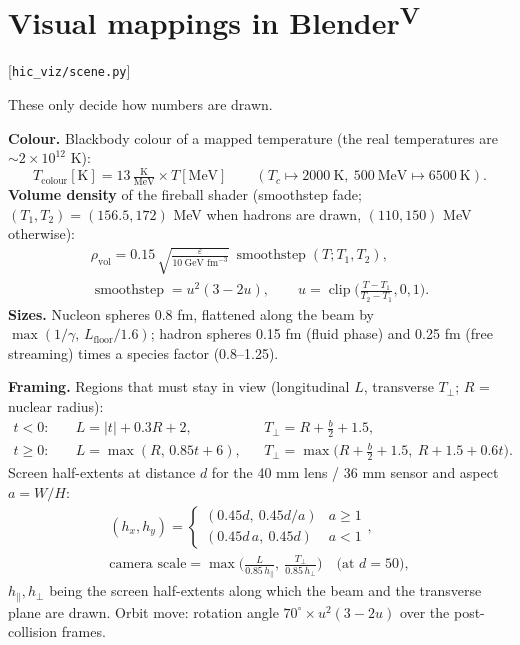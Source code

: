 \documentclass[11pt,a4paper]{article}
\newcommand{\file}[1]{\texttt{\small #1}}
\newcommand{\src}[1]{\hfill{\small\color{gray}[#1]}}
\newcommand{\vis}{\textsuperscript{\color{blue!70!black}\textbf{V}}}
\begin{document}
\section{Visual mappings in Blender\vis}
\src{\file{hic\_viz/scene.py}}

These only decide how numbers are drawn.

\textbf{Colour.} Blackbody colour of a mapped temperature (the real temperatures are $\sim2\times10^{12}$ K):
\begin{equation}
T_\text{colour}[\text{K}] = 13\,\tfrac{\text{K}}{\text{MeV}}\times T[\text{MeV}]
\qquad(T_c\mapsto2000~\text{K},\ 500~\text{MeV}\mapsto6500~\text{K}).
\end{equation}
\textbf{Volume density} of the fireball shader (smoothstep fade; $(T_1,T_2) = (156.5,172)$ MeV when hadrons are drawn,
$(110,150)$ MeV otherwise):
\begin{gather}
\rho_\text{vol} = 0.15\,\sqrt{\frac{\varepsilon}{10~\text{GeV fm}^{-3}}}\ \operatorname{smoothstep}(T;T_1,T_2),\nonumber\\
\operatorname{smoothstep} = u^2(3-2u),\qquad u=\operatorname{clip}\Big(\frac{T-T_1}{T_2-T_1},0,1\Big).
\end{gather}
\textbf{Sizes.} Nucleon spheres 0.8 fm, flattened along the beam by $\max(1/\gamma,\,L_\text{floor}/1.6)$; hadron spheres
0.15 fm (fluid phase) and 0.25 fm (free streaming) times a species factor (0.8--1.25).

\textbf{Framing.} Regions that must stay in view (longitudinal $L$, transverse $T_\perp$; $R$ = nuclear radius):
\begin{align}
t<0:&\quad L = |t|+0.3R+2, && T_\perp = R+\tfrac b2+1.5,\nonumber\\
t\ge0:&\quad L = \max(R,\,0.85t+6), && T_\perp = \max\!\big(R+\tfrac b2+1.5,\ R+1.5+0.6t\big).
\end{align}
Screen half-extents at distance $d$ for the 40 mm lens / 36 mm sensor and aspect $a=W/H$:
\begin{gather}
(h_x,h_y) = \begin{cases}(0.45d,\ 0.45d/a) & a\ge1\\ (0.45d\,a,\ 0.45d) & a<1\end{cases},\nonumber\\
\text{camera scale} = \max\!\Big(\frac{L}{0.85\,h_\parallel},\ \frac{T_\perp}{0.85\,h_\perp}\Big)\quad\text{(at } d=50\text{)},
\end{gather}
$h_\parallel,h_\perp$ being the screen half-extents along which the beam and the transverse plane are drawn.
Orbit move: rotation angle $70^\circ\times u^2(3-2u)$ over the post-collision frames.
\end{document}
